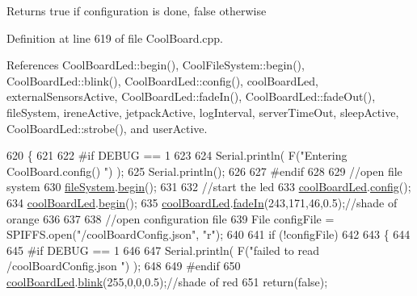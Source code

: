 \begin{DoxyReturn}{Returns}
true if configuration is done, false otherwise 
\end{DoxyReturn}


Definition at line 619 of file Cool\+Board.\+cpp.



References Cool\+Board\+Led\+::begin(), Cool\+File\+System\+::begin(), Cool\+Board\+Led\+::blink(), Cool\+Board\+Led\+::config(), cool\+Board\+Led, external\+Sensors\+Active, Cool\+Board\+Led\+::fade\+In(), Cool\+Board\+Led\+::fade\+Out(), file\+System, irene\+Active, jetpack\+Active, log\+Interval, server\+Time\+Out, sleep\+Active, Cool\+Board\+Led\+::strobe(), and user\+Active.


\begin{DoxyCode}
620 \{
621 
622 \textcolor{preprocessor}{#if DEBUG == 1}
623 
624     Serial.println( F(\textcolor{stringliteral}{"Entering CoolBoard.config() "}) );
625     Serial.println();
626 
627 \textcolor{preprocessor}{#endif}
628 
629     \textcolor{comment}{//open file system}
630     \hyperlink{classCoolBoard_a42c2586fbb13ff7f06538e9284e8538d}{fileSystem}.\hyperlink{classCoolFileSystem_a6ba6f666ed4c530174f8569d2c636748}{begin}();
631     
632     \textcolor{comment}{//start the led}
633     \hyperlink{classCoolBoard_a1b1d3c684a5baa56b08486e192fd8e97}{coolBoardLed}.\hyperlink{classCoolBoardLed_a1b60e5e30bea96c49ed62ed1bf1ffc8b}{config}();
634     \hyperlink{classCoolBoard_a1b1d3c684a5baa56b08486e192fd8e97}{coolBoardLed}.\hyperlink{classCoolBoardLed_ae3cbde8affcc6f011cbd698c8ef911f6}{begin}();
635     \hyperlink{classCoolBoard_a1b1d3c684a5baa56b08486e192fd8e97}{coolBoardLed}.\hyperlink{classCoolBoardLed_ab778f5e7bed0ab74e3906d82110493c3}{fadeIn}(243,171,46,0.5);\textcolor{comment}{//shade of orange     }
636 
637     
638     \textcolor{comment}{//open configuration file}
639     File configFile = SPIFFS.open(\textcolor{stringliteral}{"/coolBoardConfig.json"}, \textcolor{stringliteral}{"r"});
640     
641     \textcolor{keywordflow}{if} (!configFile)
642 
643     \{
644     
645 \textcolor{preprocessor}{    #if DEBUG == 1}
646 
647         Serial.println( F(\textcolor{stringliteral}{"failed to read /coolBoardConfig.json  "}) );
648 
649 \textcolor{preprocessor}{    #endif}
650         \hyperlink{classCoolBoard_a1b1d3c684a5baa56b08486e192fd8e97}{coolBoardLed}.\hyperlink{classCoolBoardLed_a96e1ea13003eee34c9dbcef340404426}{blink}(255,0,0,0.5);\textcolor{comment}{//shade of red     }
651         \textcolor{keywordflow}{return}(\textcolor{keyword}{false});

\end{DoxyCode}
